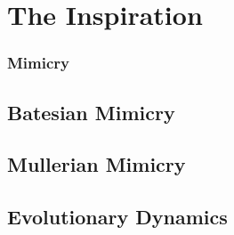 \section{The Inspiration}

\frame
{
	\frametitle{Mimicry}
}

\subsection{Batesian Mimicry}
\subsection{Mullerian Mimicry}
\subsection{Evolutionary Dynamics}
